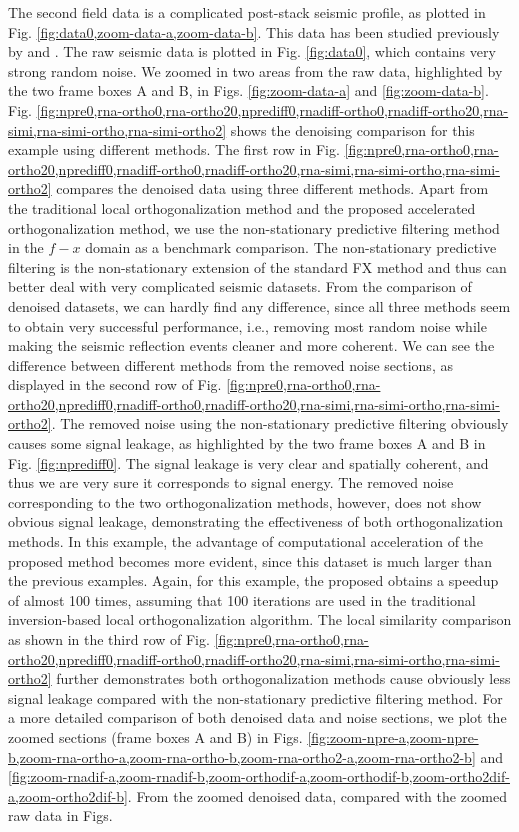 The second field data is a complicated post-stack seismic profile, as plotted in Fig. \ref{fig:data0,zoom-data-a,zoom-data-b}. This data has been studied previously by \cite{guochang2012} and \cite{yangkang2015ortho}. The raw seismic data is plotted in Fig. \ref{fig:data0}, which contains very strong random noise. We zoomed in two areas from the raw data, highlighted by the two frame boxes A and B, in Figs. \ref{fig:zoom-data-a} and \ref{fig:zoom-data-b}. Fig. \ref{fig:npre0,rna-ortho0,rna-ortho20,nprediff0,rnadiff-ortho0,rnadiff-ortho20,rna-simi,rna-simi-ortho,rna-simi-ortho2} shows the denoising comparison for this example using different methods. The first row in Fig. \ref{fig:npre0,rna-ortho0,rna-ortho20,nprediff0,rnadiff-ortho0,rnadiff-ortho20,rna-simi,rna-simi-ortho,rna-simi-ortho2} compares the denoised data using three different methods. Apart from the traditional local orthogonalization method and the proposed accelerated orthogonalization method, we use the non-stationary predictive filtering method in the $f-x$ domain \cite{guochang2012} as a benchmark comparison. The non-stationary predictive filtering is the non-stationary extension of the standard FX method and thus can better deal with very complicated seismic datasets. From the comparison of denoised datasets, we can hardly find any difference, since all three methods seem to obtain very successful performance, i.e., removing most random noise while making the seismic reflection events cleaner and more coherent. We can see the difference between different methods from the removed noise sections, as displayed in the second row of Fig. \ref{fig:npre0,rna-ortho0,rna-ortho20,nprediff0,rnadiff-ortho0,rnadiff-ortho20,rna-simi,rna-simi-ortho,rna-simi-ortho2}. The removed noise using the non-stationary predictive filtering obviously causes some signal leakage, as highlighted by the two frame boxes A and B in Fig. \ref{fig:nprediff0}. The signal leakage is very clear and spatially coherent, and thus we are very sure it corresponds to signal energy. The removed noise corresponding to the two orthogonalization methods, however, does not show obvious signal leakage, demonstrating the effectiveness of both orthogonalization methods. In this example, the advantage of computational acceleration of the proposed method becomes more evident, since this dataset is much larger than the previous examples. Again, for this example, the proposed obtains a speedup of almost 100 times, assuming that 100 iterations are used in the traditional inversion-based local orthogonalization algorithm. The local similarity comparison as shown in the third row of Fig. \ref{fig:npre0,rna-ortho0,rna-ortho20,nprediff0,rnadiff-ortho0,rnadiff-ortho20,rna-simi,rna-simi-ortho,rna-simi-ortho2} further demonstrates both orthogonalization methods cause obviously less signal leakage compared with the non-stationary predictive filtering method. For a more detailed comparison of both denoised data and noise sections, we plot the zoomed sections (frame boxes A and B) in Figs. \ref{fig:zoom-npre-a,zoom-npre-b,zoom-rna-ortho-a,zoom-rna-ortho-b,zoom-rna-ortho2-a,zoom-rna-ortho2-b} and \ref{fig:zoom-rnadif-a,zoom-rnadif-b,zoom-orthodif-a,zoom-orthodif-b,zoom-ortho2dif-a,zoom-ortho2dif-b}. From the zoomed denoised data, compared with the zoomed raw data in Figs. 